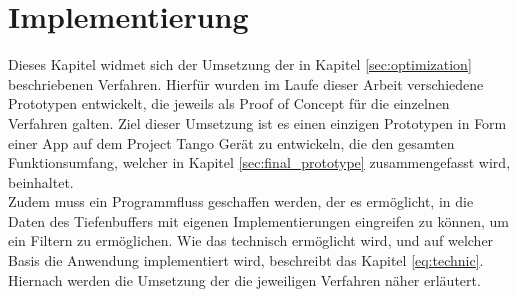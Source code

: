 \chapter{Implementierung}

Dieses Kapitel widmet sich der Umsetzung der in Kapitel \ref{sec:optimization} beschriebenen Verfahren. Hierfür wurden im Laufe dieser Arbeit verschiedene Prototypen entwickelt, die jeweils als Proof of Concept für die einzelnen Verfahren galten. Ziel dieser Umsetzung ist es einen einzigen Prototypen in Form einer App auf dem Project Tango Gerät zu entwickeln, die den gesamten Funktionsumfang, welcher in Kapitel \ref{sec:final_prototype} zusammengefasst wird, beinhaltet. \\

Zudem muss ein Programmfluss geschaffen werden, der es ermöglicht, in die Daten des Tiefenbuffers mit eigenen Implementierungen eingreifen zu können, um ein Filtern zu ermöglichen. Wie das technisch ermöglicht wird, und auf welcher Basis die Anwendung implementiert wird, beschreibt das Kapitel \ref{eq:technic}. Hiernach werden die Umsetzung der die jeweiligen Verfahren näher erläutert.










